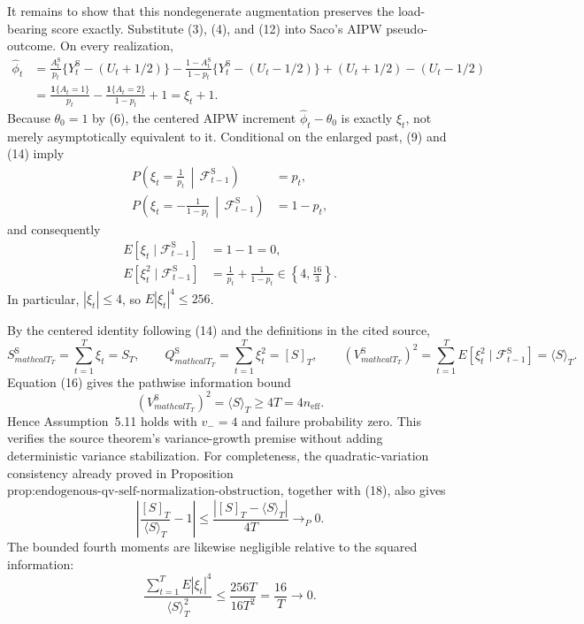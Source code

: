It remains to show that this nondegenerate augmentation preserves the load-bearing score exactly.  Substitute (3), (4), and (12) into Saco's AIPW pseudo-outcome.  On every realization,
\[
 \begin{aligned}
 \widehat\phi_t
 &=\frac{A_t^{\mathrm S}}{p_t}
      \{Y_t^{\mathrm S}-(U_t+1/2)\}
   -\frac{1-A_t^{\mathrm S}}{1-p_t}
      \{Y_t^{\mathrm S}-(U_t-1/2)\}
   +(U_t+1/2)-(U_t-1/2)\\
 &=\frac{\mathbf1\{A_t=1\}}{p_t}
   -\frac{\mathbf1\{A_t=2\}}{1-p_t}
   +1
 =\xi_t+1.
 \end{aligned}
\tag{14}
\]
Because \(\theta_0=1\) by (6), the centered AIPW increment \(\widehat\phi_t-\theta_0\) is exactly \(\xi_t\), not merely asymptotically equivalent to it.  Conditional on the enlarged past, (9) and (14) imply
\[
 \begin{aligned}
 P\!\left(\xi_t=\frac1{p_t}\,\middle|\,\mathcal F_{t-1}^{\mathrm S}\right)&=p_t,\\
 P\!\left(\xi_t=-\frac1{1-p_t}\,\middle|\,\mathcal F_{t-1}^{\mathrm S}\right)&=1-p_t,
 \end{aligned}
\tag{15}
\]
and consequently
\[
 \begin{aligned}
 E[\xi_t\mid\mathcal F_{t-1}^{\mathrm S}]&=1-1=0,\\
 E[\xi_t^2\mid\mathcal F_{t-1}^{\mathrm S}]
 &=\frac1{p_t}+\frac1{1-p_t}
 \in\left\{4,\frac{16}{3}\right\}.
 \end{aligned}
\tag{16}
\]
In particular, \(|\xi_t|\le4\), so \(E|\xi_t|^4\le256\).

By the centered identity following (14) and the definitions in the cited source,
\[
 S_{mathcal T_T}^{\mathrm S}=\sum_{t=1}^T\xi_t=S_T,
 \qquad
 Q_{mathcal T_T}^{\mathrm S}=\sum_{t=1}^T\xi_t^2=[S]_T,
 \qquad
 (V_{mathcal T_T}^{\mathrm S})^2
 =\sum_{t=1}^TE[\xi_t^2\mid\mathcal F_{t-1}^{\mathrm S}]
 =\langle S\rangle_T.
\tag{17}
\]
Equation (16) gives the pathwise information bound
\[
 (V_{mathcal T_T}^{\mathrm S})^2
 =\langle S\rangle_T
 \ge4T=4n_{\mathrm{eff}}.
\tag{18}
\]
Hence Assumption~5.11 holds with \(v_-=4\) and failure probability zero.  This verifies the source theorem's variance-growth premise without adding deterministic variance stabilization.  For completeness, the quadratic-variation consistency already proved in Proposition~\(\text{prop:endogenous-qv-self-normalization-obstruction}\), together with (18), also gives
\[
 \left|\frac{[S]_T}{\langle S\rangle_T}-1\right|
 \le\frac{|[S]_T-\langle S\rangle_T|}{4T}
 \longrightarrow_P0.
\tag{19}
\]
The bounded fourth moments are likewise negligible relative to the squared information:
\[
 \frac{\sum_{t=1}^TE|\xi_t|^4}{\langle S\rangle_T^2}
 \le\frac{256T}{16T^2}
 =\frac{16}{T}\longrightarrow0.
\tag{20}
\]

